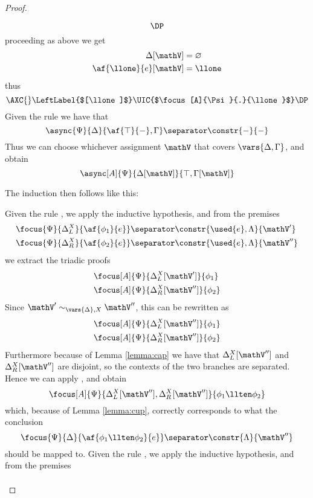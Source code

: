 \begin{proof}
\begin{itemize}
$$			\DP
			$$
			proceeding as above we get
			\begin{align*}
				\Delta[\mathV] &= \varnothing \\
				\af{\llone}{e}[\mathV] &= \llone
			\end{align*}
			thus
			$$
			\AXC{}
			\LeftLabel{$[\llone]$}
			\UIC{$\focus[A]{\Psi}{.}{\llone}$}
			\DP
			$$
		\indCase{\displaytop} Given the rule \derRule{\displaytop} we have that
			$$ \async{\Psi}{\Delta}{\af{\top}{-}, \Gamma} \separator \constr{-}{-} $$
			Thus we can choose whichever assignment $\mathV$ that covers $\vars{\Delta, \Gamma}$, and obtain
			$$ \async[A]{\Psi}{\Delta[\mathV]}{\top, \Gamma[\mathV]} $$
	\end{itemize}
	The induction then follows like this:
	\begin{itemize}
		\indCase{\displayten} Given the rule \derRule{\displayten}, we apply the inductive hypothesis, and from the premises 
			\begin{align*}
				&\focus{\Psi}{\Delta_L^X}{\af{\phi_1}{e}} \separator \constr{\used{e}, \Lambda}{\mathV'} \\
				&\focus{\Psi}{\Delta_R^X}{\af{\phi_2}{e}} \separator \constr{\used{e}, \Lambda}{\mathV''} 
			\end{align*}
			we extract the triadic proofs
			\begin{align*}
				&\focus[A]{\Psi}{\Delta_L^X[\mathV']}{\phi_1} \\
				&\focus[A]{\Psi}{\Delta_R^X[\mathV'']}{\phi_2} 
			\end{align*}
			Since $\mathV' \sim_{\vars{\Delta}, X} \mathV''$, this can be rewritten as
			\begin{align*}
				&\focus[A]{\Psi}{\Delta_L^X[\mathV'']}{\phi_1} \\
				&\focus[A]{\Psi}{\Delta_R^X[\mathV'']}{\phi_2} 
			\end{align*}
			Furthermore because of Lemma \ref{lemma:cap} we have that $\Delta_L^X[\mathV'']$ and $\Delta_R^X[\mathV'']$ are disjoint, so the contexts of the two branches are separated.
			Hence we can apply \derRule[A]{\displayten}, and obtain
			$$ \focus[A]{\Psi}{\Delta_L^X[\mathV''], \Delta_R^X[\mathV'']}{\phi_1 \llten \phi_2} $$
			which, because of Lemma \ref{lemma:cup}, correctly corresponds to what the conclusion
			$$ \focus{\Psi}{\Delta}{\af{\phi_1 \llten \phi_2}{e}} \separator \constr{\Lambda}{\mathV''} $$
			should be mapped to.
		\indCase{\displaywith} Given the rule \derRule{\displaywith}, we apply the inductive hypothesis, and from the premises
			\begin{align*}

\end{align*}
\end{itemize}
\end{proof}
